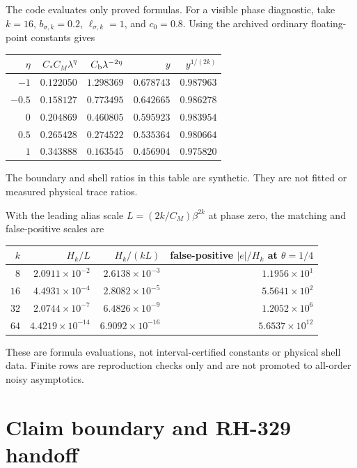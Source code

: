 \documentclass[11pt]{article}
\theoremstyle{remark}
\begin{document}
The code evaluates only proved formulas.  For a visible phase diagnostic,
take $k=16$, $b_{\sigma,k}=0.2$, $\ell_{\sigma,k}=1$, and $c_0=0.8$.
Using the archived ordinary floating-point constants gives
\begin{center}\small
\begin{tabular}{rrrrr}
\toprule
$\eta$ & $C_*C_M\lambda^\eta$ & $C_{\rm b}\lambda^{-2\eta}$
& $y$ & $y^{1/(2k)}$\\
\midrule
$-1$   & $0.122050$ & $1.298369$ & $0.678743$ & $0.987963$\\
$-0.5$ & $0.158127$ & $0.773495$ & $0.642665$ & $0.986278$\\
$0$    & $0.204869$ & $0.460805$ & $0.595923$ & $0.983954$\\
$0.5$  & $0.265428$ & $0.274522$ & $0.535364$ & $0.980664$\\
$1$    & $0.343888$ & $0.163545$ & $0.456904$ & $0.975820$\\
\bottomrule
\end{tabular}
\end{center}
The boundary and shell ratios in this table are synthetic.  They are not
fitted or measured physical trace ratios.

With the leading alias scale $L=(2k/C_M)\beta^{2k}$ at phase zero, the
matching and false-positive scales are
\begin{center}\small
\begin{tabular}{rrrr}
\toprule
$k$ & $H_k/L$ & $H_k/(kL)$ &
false-positive $|e|/H_k$ at $\theta=1/4$\\
\midrule
$8$  & $2.0911\times10^{-2}$  & $2.6138\times10^{-3}$  & $1.1956\times10^{1}$\\
$16$ & $4.4931\times10^{-4}$  & $2.8082\times10^{-5}$  & $5.5641\times10^{2}$\\
$32$ & $2.0744\times10^{-7}$  & $6.4826\times10^{-9}$  & $1.2052\times10^{6}$\\
$64$ & $4.4219\times10^{-14}$ & $6.9092\times10^{-16}$ & $5.6537\times10^{12}$\\
\bottomrule
\end{tabular}
\end{center}
These are formula evaluations, not interval-certified constants or physical
shell data.  Finite rows are reproduction checks only and are not promoted
to all-order noisy asymptotics.

\section{Claim boundary and RH-329 handoff}
\end{document}
